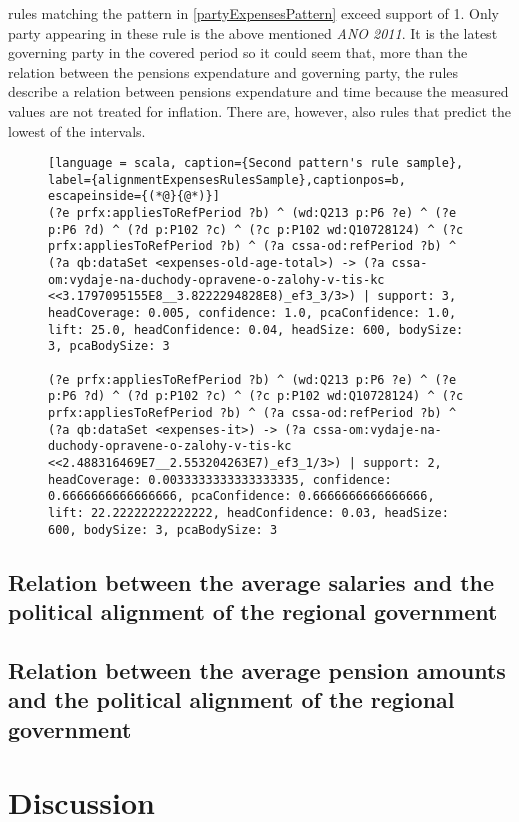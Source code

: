  rules matching the pattern in \ref{partyExpensesPattern} exceed support of 1. Only party appearing in these rule is the above mentioned \textit{ANO 2011}. It is the latest governing party in the covered period so it could seem that, more than the relation between the pensions expendature and governing party, the rules describe a relation between pensions expendature and time because the measured values are not treated for inflation. There are, however, also rules that predict the lowest of the intervals.

\begin{figure}[h]
\begin{lstlisting}[language = scala, caption={Second pattern's rule sample}, label={alignmentExpensesRulesSample},captionpos=b, escapeinside={(*@}{@*)}]
(?e prfx:appliesToRefPeriod ?b) ^ (wd:Q213 p:P6 ?e) ^ (?e p:P6 ?d) ^ (?d p:P102 ?c) ^ (?c p:P102 wd:Q10728124) ^ (?c prfx:appliesToRefPeriod ?b) ^ (?a cssa-od:refPeriod ?b) ^ (?a qb:dataSet <expenses-old-age-total>) -> (?a cssa-om:vydaje-na-duchody-opravene-o-zalohy-v-tis-kc <<3.1797095155E8__3.8222294828E8)_ef3_3/3>) | support: 3, headCoverage: 0.005, confidence: 1.0, pcaConfidence: 1.0, lift: 25.0, headConfidence: 0.04, headSize: 600, bodySize: 3, pcaBodySize: 3

(?e prfx:appliesToRefPeriod ?b) ^ (wd:Q213 p:P6 ?e) ^ (?e p:P6 ?d) ^ (?d p:P102 ?c) ^ (?c p:P102 wd:Q10728124) ^ (?c prfx:appliesToRefPeriod ?b) ^ (?a cssa-od:refPeriod ?b) ^ (?a qb:dataSet <expenses-it>) -> (?a cssa-om:vydaje-na-duchody-opravene-o-zalohy-v-tis-kc <<2.488316469E7__2.553204263E7)_ef3_1/3>) | support: 2, headCoverage: 0.0033333333333333335, confidence: 0.6666666666666666, pcaConfidence: 0.6666666666666666, lift: 22.22222222222222, headConfidence: 0.03, headSize: 600, bodySize: 3, pcaBodySize: 3
\end{lstlisting}
\end{figure}

\subsection{Relation between the average salaries and the political alignment of the regional government}

\subsection{Relation between the average pension amounts and the political alignment of the regional government}

\section{Discussion}